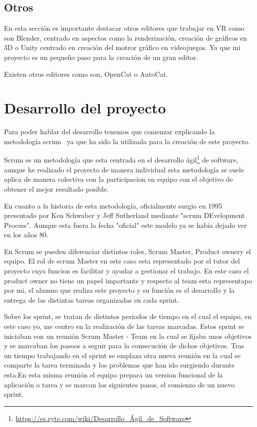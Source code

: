 \documentclass[a4paper, 12pt]{book}
\begin{document}
\section{Otros} %
\label{sec:Otros}
En esta sección es importante destacar otros editores que trabajar en VR como son Blender, centrado en aspectos como la renderización, creación de gráficos en 3D o Unity centrado en creación del motror gráfico en videojuegos. Ya que mi proyecto es un pequeño paso para la creación de un gran editor.

Existen otros editores como son, OpenCat o AutoCat.


\cleardoublepage
\chapter{Desarrollo del proyecto}
\label{chap:Desarrollo del proyecto}
Para poder hablar del desarrollo tenemos que comenzar explicando la metodología scrum~\cite{proyectos} ya que ha sido la utilizada para la creación de este proyecto.

Scrum es un metodología que esta centrada en el desarrollo ágil\footnote{\url{https://es.ryte.com/wiki/Desarrollo_Ágil_de_Software}}  de software, aunque he realizado el proyecto de manera individual esta metodología se suele aplica de manera colectiva con la participacion en equipo con el objetivo de obtener el mejor resultado posible.

En cuanto a la historia de esta metodología, oficialmente surgio en 1995 presentado por Ken Schwaber y Jeff Sutherland mediante "scrum DEvelopment Process". Aunque esta fuera la fecha "oficial" este modelo ya se habia dejado ver en los años 80.

En Scrum se pueden diferenciar distintos roles, Scrum Master, Product ownery el equipo. El rol de scrum Master en este caso esta representado por el tutor del proyecto cuya funcion es facilitar y ayudar a gestionar el trabajo. En este caso el product owner no tiene un papel importante y respecto al team esta representapo por mi, el alumno que realiza este proyecto y su función es el desarrollo y la entrega de las distintas tareas organizadas en cada sprint.

Sobre los sprint, se tratan de distintos periodos de tiempo en el cual el equipo, en este caso yo, me centro en la realización de las tareas marcadas. Estos sprint se iniciaban con un reunión Scrum Master - Team en la cual se fijaba unos objetivos y se marcaban los pasoos a seguir para la consecución de dichos objetivos. Tras un tiempo trabajando en el sprint se emplaza otra nueva reunión en la cual se comparte la tarea terminada y los problemas que han ido surgiendo durante esta.En esta misma reunión el equipo prepara un version funcional de la aplicación o tarea y se marcan los siguientes pasos, el comienzo de un nuevo sprint. 
\end{document}
